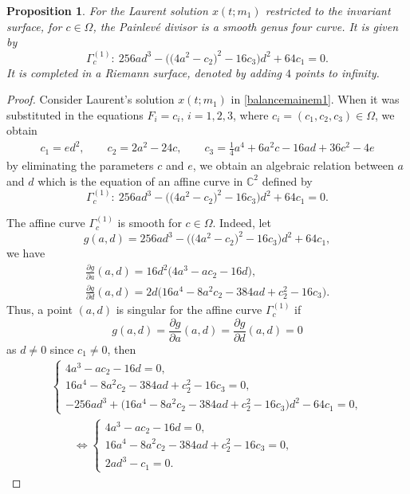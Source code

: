 \documentclass[10pt,a4paper]{amsart}
\numberwithin{equation}{section}
\newtheorem{Proposition}[Theorem]{Proposition}
 { \theoremstyle{definition}
\newtheorem{Definition}[Theorem]{Definition}
\newtheorem{Note}[Theorem]{Note}
\newtheorem{Example}[Theorem]{Example}
\newtheorem{Remark}[Theorem]{Remark} }
\begin{document}
\begin{Proposition}\label{proposition3.5}
For the Laurent solution $x(t;m_1)$ restricted to the
invariant surface, for $c \in \Omega$, the Painlev\'e divisor
 is a smooth genus four curve. It is
given by
\begin{equation*}
 \Gamma_c^{(1)}\colon \ 256ad^3-\bigl(\bigl(4a^2-c_2\bigr)^2-16c_3\bigr)d^2+64c_1=0.
\end{equation*}
It is completed in a Riemann surface, denoted
 by adding $4$ points to
infinity.
\end{Proposition}

\begin{proof}
Consider Laurent's solution $x(t;m_1)$ in \eqref{balancemainem1}. When it was substituted in the
equations $F_i=c_i$, $i=1,2,3$, where
$c_i=(c_1,c_2,c_3)\in \Omega$, we
obtain
\begin{gather*}
 c_1 = ed^2, \qquad
 c_2 = 2a^2-24c, \qquad
 c_3 = \frac{1}{4}a^4+6a^2c-16ad+36c^2-4e
\end{gather*}
by eliminating the parameters $c$ and $e$, we obtain an algebraic
relation between $a$ and $d$ which is the equation of an affine
curve in $\mathbb{C}^2$ defined by
\begin{equation*}
 \Gamma_c^{(1)}\colon \ 256ad^3-\bigl(\bigl(4a^2-c_2\bigr)^2-16c_3\bigr)d^2+64c_1=0.
\end{equation*}

The affine curve $ \Gamma_c^{(1)}$ is smooth for $c\in
\Omega$. Indeed, let
\[g(a,d)=256ad^3-\bigl(\bigl(4a^2-c_2\bigr)^2-16c_3\bigr)d^2+64c_1, \]
we have
\begin{gather*}
 \frac{\partial g}{\partial a}(a,d) = 16d^2\bigl(4a^3-ac_2-16d\bigr),\\
 \frac{\partial g}{\partial d}(a,d) = 2d\bigl(16a^4-8a^2c_2-384ad+c_2^2-16c_3\bigr).
\end{gather*}
Thus, a point $(a,d)$ is singular for the affine curve $
\Gamma_c^{(1)}$ if \[g(a,d)= \frac{\partial
g}{\partial a}(a,d)= \frac{\partial g}{\partial
d}(a,d)=0\] as $d\neq 0$ since $c_1
\neq 0$, then
\begin{gather*}
 \begin{cases}
 4a^3-ac_2-16d=0, \\
 16a^4-8a^2c_2-384ad+c_2^2-16c_3=0 ,\\
 -256ad^3+\bigl(16a^4-8a^2c_2-384ad+c_2^2-16c_3\bigr)d^2-64c_1=0,
 \end{cases} \\
\qquad{}\Leftrightarrow
 \begin{cases}
 4a^3-ac_2-16d=0, \\
 16a^4-8a^2c_2-384ad+c_2^2-16c_3=0 ,\\
 2ad^3-c_1=0.
 \end{cases}
\end{gather*}


\end{proof}
\end{document}
